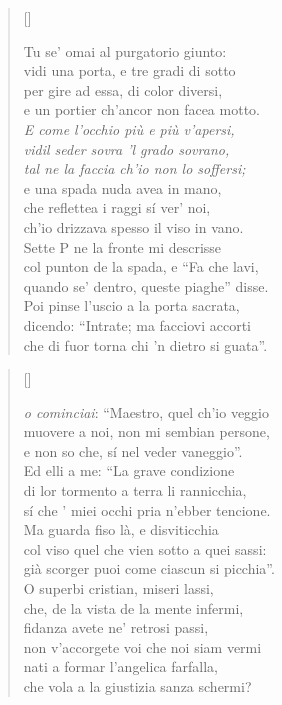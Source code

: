 \documentclass{article}
\begin{document}
\begin{verse}[\versewidth]
  \begin{patverse*}
    Tu se' omai al purgatorio giunto:\\
    vidi una porta, e tre gradi di sotto\\
    per gire ad essa, di color diversi,\\
    e un portier ch'ancor non facea motto.\\
    \emph{E come l'occhio più e più v'apersi,\\
    vidil seder sovra 'l grado sovrano,\\
    tal ne la faccia ch'io non lo soffersi;}\\
    e una spada nuda avea in mano,\\
    che reflettea i raggi sí ver' noi,\\
    ch'io drizzava spesso il viso in vano.\\
    Sette P ne la fronte mi descrisse\\
    col punton de la spada, e ``Fa che lavi,\\
    quando se' dentro, queste piaghe'' disse.\\
    Poi pinse l'uscio a la porta sacrata,\\
    dicendo: ``Intrate; ma facciovi accorti\\
    che di fuor torna chi 'n dietro si guata''.\\
  \end{patverse*}
\end{verse}

\begin{verse}[\versewidth]
  \begin{patverse*}
    \emph{o cominciai}: ``Maestro, quel ch'io veggio\\
    muovere a noi, non mi sembian persone,\\
    e non so che, sí nel veder vaneggio''.\\
    Ed elli a me: ``La grave condizione\\
    di lor tormento a terra li rannicchia,\\
    sí che ' miei occhi pria n'ebber tencione.\\
    Ma guarda fiso là, e disviticchia\\
    col viso quel che vien sotto a quei sassi:\\
    già scorger puoi come ciascun si picchia''.\\
    O superbi cristian, miseri lassi,\\
    che, de la vista de la mente infermi,\\
    fidanza avete ne' retrosi passi,\\
    non v'accorgete voi che noi siam vermi\\
    nati a formar l'angelica farfalla,\\
    che vola a la giustizia sanza schermi?
    \end{patverse*}
\end{verse}
\end{document}

